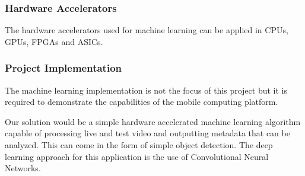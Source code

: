 \subsubsection{Hardware Accelerators} %
The hardware accelerators used for machine learning can be applied in CPUs, GPUs, FPGAs and ASICs. 

\subsubsection{Project Implementation}
The machine learning implementation is not the focus of this project but it is required to demonstrate the capabilities of the mobile computing platform. 

Our solution would be a simple hardware accelerated machine learning algorithm capable of processing live and test video and outputting metadata that can be analyzed. This can come in the form of simple object detection. The deep learning approach for this application is the use of Convolutional Neural Networks.

